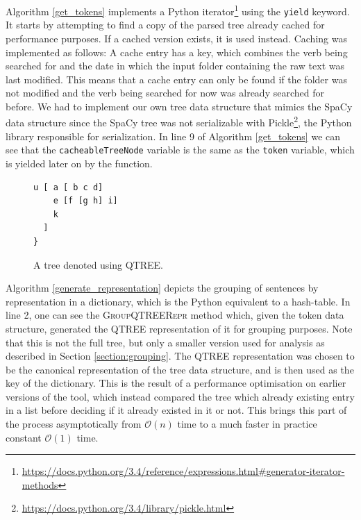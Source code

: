 \documentclass[11pt,a4paper,openright]{memoir}
\begin{document}
Algorithm \ref{get_tokens} implements a Python iterator\footnote{\url{https://docs.python.org/3.4/reference/expressions.html\#generator-iterator-methods}} using the \texttt{yield} keyword. It starts by attempting to find a copy of the parsed tree already cached for performance purposes. If a cached version exists, it is used instead. Caching was implemented as follows: A cache entry has a key, which combines the verb being searched for and the date in which the input folder containing the raw text was last modified. This means that a cache entry can only be found if the folder was not modified and the verb being searched for now was already searched for before. We had to implement our own tree data structure that mimics the SpaCy data structure since the SpaCy tree was not serializable with Pickle\footnote{\url{https://docs.python.org/3.4/library/pickle.html}}, the Python library responsible for serialization. In line 9 of Algorithm \ref{get_tokens} we can see that the \texttt{cacheableTreeNode} variable is the same as the \texttt{token} variable, which is yielded later on by the function.


\begin{figure}[!htbp]

\begin{verbatim}
u [ a [ b c d]
    e [f [g h] i]
    k 
  ]
}
\end{verbatim}

  \caption[A tree denoted using QTREE.]{A tree denoted using QTREE.}
  \label{fig:qtree_lang}
\end{figure}


Algorithm \ref{generate_representation} depicts the grouping of sentences by representation in a dictionary, which is the Python equivalent to a hash-table. In line 2, one can see the \textsc{GroupQTREERepr} method which, given the token data structure, generated the QTREE \cite{qtree} representation of it for grouping purposes. Note that this is not the full tree, but only a smaller version used for analysis as described in Section \ref{section:grouping}. The QTREE representation was chosen to be the canonical representation of the tree data structure, and is then used as the key of the dictionary. This is the result of a performance optimisation on earlier versions of the tool, which instead compared the tree which already existing entry in a list before deciding if it already existed in it or not. This brings this part of the process asymptotically from $\mathcal{O}(n)$ time to a much faster in practice constant $\mathcal{O}(1)$ time.
\end{document}
